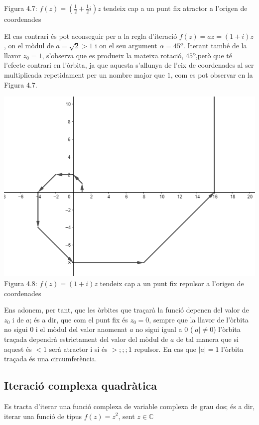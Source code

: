 \documentclass[12pt]{report}
\begin{document}
\begin{itemize}
\begin{center}
    \newline
    Figura 4.7: $f(z)= \left( \frac{1}{2}+ \frac{1}{2}i \right)z$ tendeix cap a un punt fix atractor a l'origen de coordenades
    \end{center}
    El cas contrari és pot aconseguir per a la regla d'iteració $f(z)=az=(1+i)z$, on el mòdul de $a=\sqrt{2}>1$ i on el seu argument $\alpha=45º$. Iterant també de la llavor $z_0=1$, s'observa que es produeix la mateixa rotació, $45º$,però que té l'efecte contrari en l'òrbita, ja que aquesta s'allunya de l'eix de coordenades al ser multiplicada repetidament per un nombre major que $1$, com es pot observar en la Figura 4.7.
    \begin{center}
        \includegraphics[width=0.7 \textwidth]{orbitarepulsiva.PNG}
    \newline
    Figura 4.8: $f(z)= (1+i)z$ tendeix cap a un punt fix repulsor a l'origen de coordenades
    \end{center}
   Ens adonem, per tant, que les òrbites que traçarà la funció depenen del valor de $z_0$ i de $a$; és a dir, que com el punt fix és $z_0=0$, sempre que la llavor de l'òrbita no sigui 0 i el mòdul del valor anomenat $a$ no sigui igual a 0 ($|a| \neq 0$) l'òrbita traçada dependrà estrictament del valor del mòdul de $a$ de tal manera que si aquest és $<1$ serà atractor i si és $>;;;1$ repulsor. En cas que $|a|=1$ l'òrbita traçada és una circumferència.
\end{itemize}
\subsection{Iteració complexa quadràtica}
Es tracta d'iterar una funció complexa de variable complexa de grau dos; és a dir, iterar una funció de tipus $f(z)=z^2$, sent $z\in  \mathbb{C}$
\end{document}

